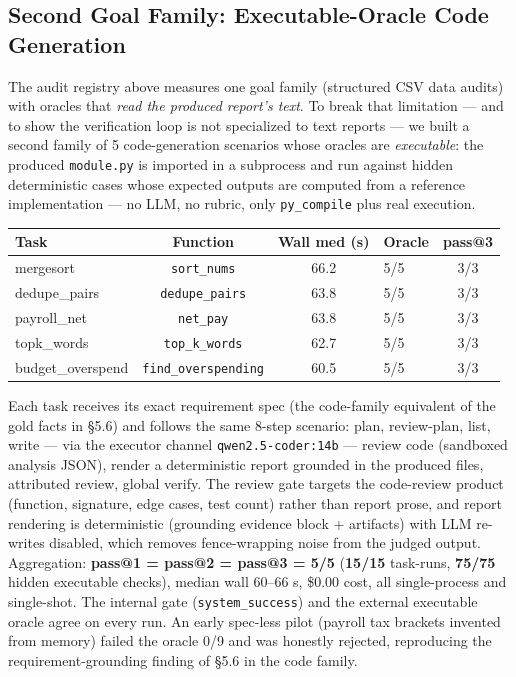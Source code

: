 \documentclass[11pt]{article}
\begin{document}
\subsection{Second Goal Family: Executable-Oracle Code Generation}
The audit registry above measures one goal family (structured CSV data audits) with oracles
that \emph{read the produced report's text}. To break that limitation --- and to show the
verification loop is not specialized to text reports --- we built a
second family of 5 code-generation scenarios whose oracles are
\emph{executable}: the produced \texttt{module.py} is imported in a subprocess and run
against hidden deterministic cases whose expected outputs are computed from a reference
implementation --- no LLM, no rubric, only \texttt{py\_compile} plus real execution.

\begin{center}
\begin{tabular}{@{}lcclc@{}}
\toprule
Task & Function & Wall med (s) & Oracle & pass@3\\
\midrule
mergesort & \texttt{sort\_nums} & 66.2 & 5/5 & 3/3\\
dedupe\_pairs & \texttt{dedupe\_pairs} & 63.8 & 5/5 & 3/3\\
payroll\_net & \texttt{net\_pay} & 63.8 & 5/5 & 3/3\\
topk\_words & \texttt{top\_k\_words} & 62.7 & 5/5 & 3/3\\
budget\_overspend & \texttt{find\_overspending} & 60.5 & 5/5 & 3/3\\
\bottomrule
\end{tabular}
\end{center}

Each task receives its exact requirement spec (the code-family equivalent of the gold facts
in \S5.6) and follows the same 8-step scenario: plan, review-plan, list, write --- via the
executor channel \texttt{qwen2.5-coder:14b} --- review code (sandboxed analysis JSON),
render a deterministic report grounded in the produced files, attributed review, global
verify. The review gate targets the code-review product (function, signature, edge cases,
test count) rather than report prose, and report rendering is deterministic (grounding
evidence block + artifacts) with LLM re-writes disabled, which removes fence-wrapping
noise from the judged output. Aggregation: \textbf{pass@1 = pass@2 = pass@3 = 5/5}
(\textbf{15/15} task-runs, \textbf{75/75} hidden executable checks), median wall 60--66 s,
\$0.00 cost, all single-process and single-shot. The internal gate (\texttt{system\_success})
and the external executable oracle agree on every run. An early spec-less pilot (payroll
tax brackets invented from memory) failed the oracle 0/9 and was honestly rejected,
reproducing the requirement-grounding finding of \S5.6 in the code family.
\end{document}
